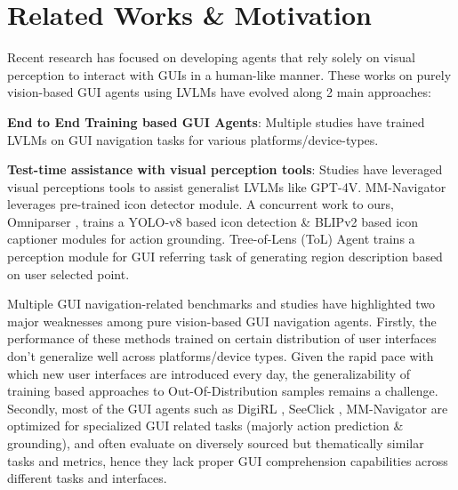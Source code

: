 \section{Related Works \& Motivation}
Recent research has focused on developing agents that rely solely on visual perception to interact with GUIs in a human-like manner. These works on purely vision-based GUI agents using LVLMs have evolved along 2 main approaches:

\textbf{End to End Training based GUI Agents}: Multiple studies \cite{Hong2023CogAgentAV, You2024FerretUIGM, Cheng2024SeeClickHG, Bai2024DigiRLTI, shaw2023pixels} have trained LVLMs on GUI navigation tasks for various platforms/device-types. 



\textbf{Test-time assistance with visual perception tools}: Studies have leveraged visual perceptions tools to assist generalist LVLMs like GPT-4V. MM-Navigator \citep{Yan2023GPT4VIW} leverages pre-trained icon detector module. A concurrent work to ours, Omniparser \citep{OmniParser}, trains a YOLO-v8 \citep{yolov8_ultralytics} based icon detection \& BLIPv2 \citep{blip2} based icon captioner modules for action grounding. Tree-of-Lens (ToL) Agent \cite{fan2024readpointedlayoutawaregui} trains a perception module for GUI referring task of generating region description based on user selected point. 

Multiple GUI navigation-related benchmarks \cite{Liu2024VisualWebBenchHF, Xie2024OSWorldBM} and studies \cite{zheng2023seeact, Cheng2024SeeClickHG} have highlighted two major weaknesses among pure vision-based GUI navigation agents. Firstly, the performance of these methods trained on certain distribution of user interfaces don't generalize well across platforms/device types. Given the rapid pace with which new user interfaces are introduced every day, the generalizability of training based approaches to Out-Of-Distribution samples remains a challenge. Secondly, most of the GUI agents such as DigiRL \cite{Bai2024DigiRLTI}, SeeClick \cite{Cheng2024SeeClickHG},  MM-Navigator \cite{Yan2023GPT4VIW} are optimized for specialized GUI related tasks (majorly action prediction \& grounding), and often evaluate on diversely sourced but thematically similar tasks and metrics, hence they lack proper GUI comprehension capabilities across different tasks and interfaces.

